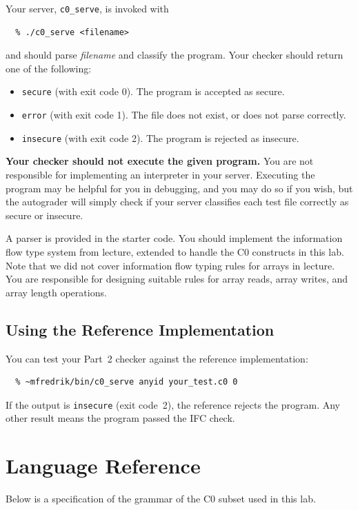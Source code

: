 \documentclass[11pt]{article}
\begin{document}
Your server, \verb'c0_serve', is invoked with
\begin{verbatim}
  % ./c0_serve <filename>
\end{verbatim}
and should parse \emph{filename} and classify the program.  Your checker
should return one of the following:
\begin{itemize}
  \item \verb'secure' (with exit code 0).  The program is accepted as secure.
  \item \verb'error' (with exit code 1).  The file does not exist, or
    does not parse correctly.
  \item \verb'insecure' (with exit code 2).  The program is rejected as insecure.
\end{itemize}

\textbf{Your checker should not execute the given program.} You are not 
responsible for implementing an interpreter in your server. Executing the
program may be helpful for you in debugging, and you may do so if you wish, 
but the autograder will simply check if your server classifies each test file 
correctly as secure or insecure.

A parser is provided in the starter code.  You should implement the information
flow type system from lecture, extended to handle the C0 constructs in this lab.
Note that we did not cover information flow typing rules for arrays in lecture.
You are responsible for designing suitable rules for array reads, array writes,
and array length operations. 

\subsection{Using the Reference Implementation}

You can test your Part~2 checker against the reference implementation:
\begin{verbatim}
  % ~mfredrik/bin/c0_serve anyid your_test.c0 0
\end{verbatim}
If the output is \texttt{insecure} (exit code~2), the reference rejects the
program.  Any other result means the program passed the IFC check.

\section{Language Reference}

Below is a specification of the grammar of the C0 subset used in this lab.
\end{document}
